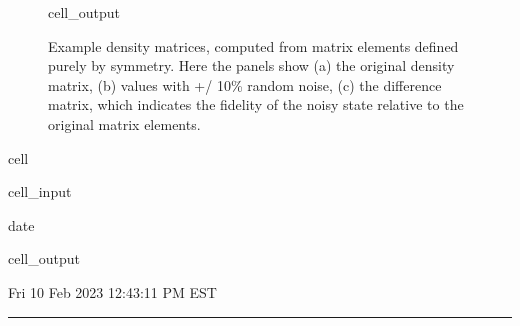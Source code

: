 \documentclass[letterpaper,table,10pt,english]{jupyterBook}
\begin{document}
\begin{figure}[htbp]
\centering
\capstart
\begin{sphinxVerbatimOutput}

\begin{sphinxuseclass}{cell_output}
\noindent{}

\end{sphinxuseclass}\end{sphinxVerbatimOutput}
\caption{Example density matrices, computed from matrix elements defined purely by  symmetry. Here the panels show (a) the original density matrix, (b) values with +/\sphinxhyphen{} 10\% random noise, (c) the difference matrix, which indicates the fidelity of the noisy state relative to the original matrix elements.}\label{\detokenize{part1/theory_density_matrices_310123:fig-denmatd2hcompexample}}\end{figure}

\begin{sphinxuseclass}{cell}\begin{sphinxVerbatimInput}

\begin{sphinxuseclass}{cell_input}
\begin{sphinxVerbatim}[commandchars=\\\{\}]
date
\end{sphinxVerbatim}

\end{sphinxuseclass}\end{sphinxVerbatimInput}
\begin{sphinxVerbatimOutput}

\begin{sphinxuseclass}{cell_output}
\begin{sphinxVerbatim}[commandchars=\\\{\}]
Fri 10 Feb 2023 12:43:11 PM EST
\end{sphinxVerbatim}

\end{sphinxuseclass}\end{sphinxVerbatimOutput}

\end{sphinxuseclass}

\bigskip\hrule\bigskip


\sphinxstepscope
\end{document}
